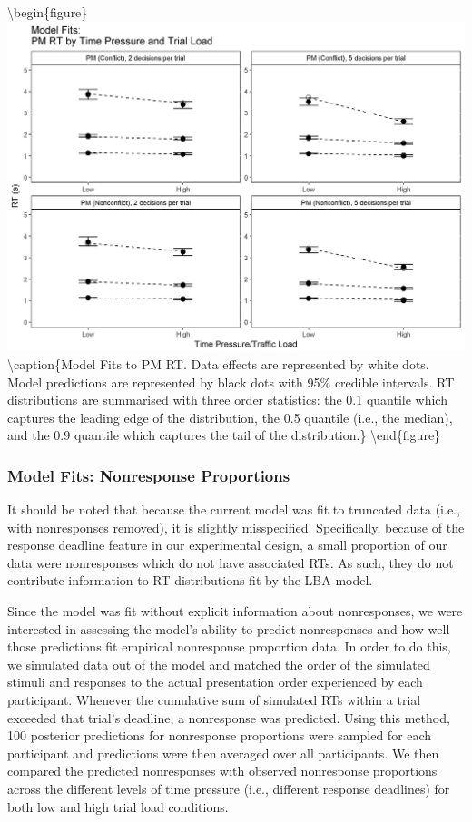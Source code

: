 \documentclass[11pt,]{article}
\begin{document}
\textbackslash{}begin\{figure\}
\includegraphics[width=0.8\linewidth]{figures/E1/E1.Fits.RT.PM}
\textbackslash{}caption\{\label{fig:Fits.RT.PM}Model Fits to PM RT. Data
effects are represented by white dots. Model predictions are represented
by black dots with 95\% credible intervals. RT distributions are
summarised with three order statistics: the 0.1 quantile which captures
the leading edge of the distribution, the 0.5 quantile (i.e., the
median), and the 0.9 quantile which captures the tail of the
distribution.\}\label{fig:Fit Plot: RT PM} \textbackslash{}end\{figure\}

\subsubsection{Model Fits: Nonresponse
Proportions}\label{model-fits-nonresponse-proportions}

It should be noted that because the current model was fit to truncated
data (i.e., with nonresponses removed), it is slightly misspecified.
Specifically, because of the response deadline feature in our
experimental design, a small proportion of our data were nonresponses
which do not have associated RTs. As such, they do not contribute
information to RT distributions fit by the LBA model.

Since the model was fit without explicit information about nonresponses,
we were interested in assessing the model's ability to predict
nonresponses and how well those predictions fit empirical nonresponse
proportion data. In order to do this, we simulated data out of the model
and matched the order of the simulated stimuli and responses to the
actual presentation order experienced by each participant. Whenever the
cumulative sum of simulated RTs within a trial exceeded that trial's
deadline, a nonresponse was predicted. Using this method, 100 posterior
predictions for nonresponse proportions were sampled for each
participant and predictions were then averaged over all participants. We
then compared the predicted nonresponses with observed nonresponse
proportions across the different levels of time pressure (i.e.,
different response deadlines) for both low and high trial load
conditions.
\end{document}
